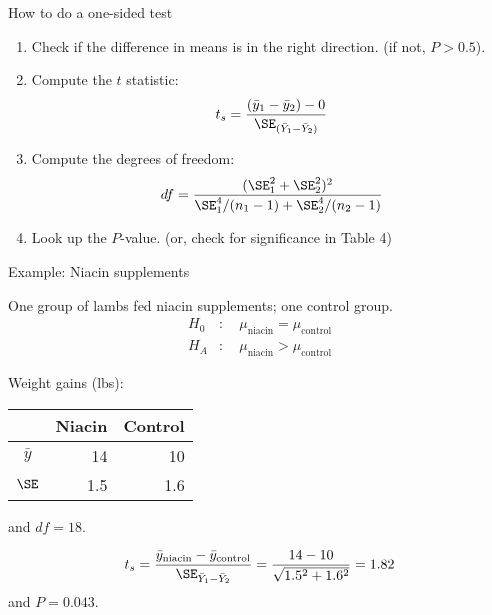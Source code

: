 \begin{frame}{How to do a one-sided test}

  \begin{center}
  \end{center}

  \vspace{-1em}

  \begin{enumerate}
    \item Check if the difference in means is in the right direction. (if not, $P>0.5$).

    \item Compute the $t$ statistic:
      \[
          t_s = \frac{ (\bar y_1 - \bar y_2) - 0}{ \SE_{(\bar Y_1 - \bar Y_2)} }
      \]

    \item Compute the degrees of freedom:
        \[
            df = \frac{ (\SE_1^2 + \SE_2^2)^2 }{ \SE_1^4 / (n_1-1) + \SE_2^4 / (n_2 - 1) }
        \]

    \item Look up the $P$-value. (or, check for significance in Table 4)

  \end{enumerate}


\end{frame}

\begin{frame}{Example: Niacin supplements}

  One group of lambs fed niacin supplements; one control group.  
  \begin{align*}
    H_0 &: \quad \mu_\text{niacin} = \mu_\text{control}  \\
    H_A &: \quad \mu_\text{niacin} > \mu_\text{control}  
  \end{align*}


    \vspace{2em}

  
  Weight gains (lbs):
    \begin{center}
      \begin{tabular}{c|rr}
            & Niacin & Control \\
          \hline
          $\bar y$ & 14 & 10 \\
          $\SE$ & 1.5 & 1.6 \\
     \end{tabular}
   \end{center}
   and $df = 18$.


    \vspace{2em}
    \pause

    \[
    t_s = \frac{ \bar y_\text{niacin} - \bar y_\text{control} }{ \SE_{\bar Y_1 - \bar Y_2} } = \frac{ 14 - 10 }{ \sqrt{ 1.5^2 + 1.6^2 } } = 1.82
    \]
    and $P = 0.043$.
    \pause

\end{frame}


